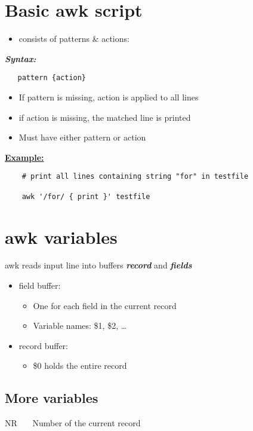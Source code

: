 \documentclass{report}
\begin{document}
   \section{Basic awk script}
   \begin{itemize}
     \item consists of patterns \& actions: 
   \end{itemize}
   \bigbreak \noindent
   \textbf{\textit{Syntax:}}
   \begin{verbatim}
   pattern {action}
   \end{verbatim}
   \bigbreak \noindent
   \begin{itemize}
     \item If pattern is missing, action is applied to all lines 
     \item if action is missing, the matched line is printed
     \item Must have either pattern or action
   \end{itemize}
   \bigbreak \noindent
   \textbf{\underline{Example:}}
   \begin{verbatim}
    # print all lines containing string "for" in testfile

    awk '/for/ { print }' testfile
   \end{verbatim}
   \newpage \noindent
   \section{awk variables}
   awk reads input line into buffers \textit{\textbf{record}} and \textit{\textbf{fields}}
   \begin{itemize}
     \item field buffer: 
       \begin{itemize}[label=$\bullet$]
        \item One for each field in the current record 
        \item Variable names: \$1, \$2, \ldots
       \end{itemize}
     \item record buffer:
       \begin{itemize}[label=$\bullet$]
         \item \$0 holds the entire record
       \end{itemize}
   \end{itemize}
   \subsection{More variables}
  NR \ \ \ Number of the current record \vspace{1.5mm}
\end{document}
